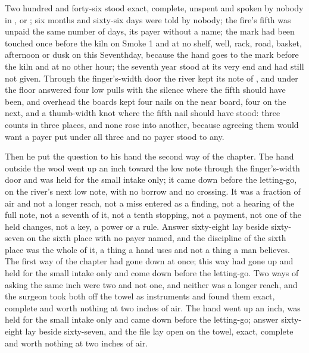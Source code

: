 Two hundred and forty-six stood exact, complete, unspent and spoken by nobody in ,  or ; six months and sixty-six days were told by nobody; the fire's fifth was unpaid the same number of days, its payer without a name; the mark had been touched once before the kiln on Smoke 1 and at no shelf, well, rack, road, basket, afternoon or dusk on this Seventhday, because the hand goes to the mark before the kiln and at no other hour; the seventh year stood at its very end and had still not given. Through the finger's-width door the river kept its note of , and under the floor  answered four low pulls with the silence where the fifth should have been, and overhead the boards kept four nails on the near board, four on the next, and a thumb-width knot where the fifth nail should have stood: three counts in three places, and none rose into another, because agreeing them would want a payer put under all three and no payer stood to any.

Then he put the question to his hand the second way of the chapter. The hand outside the wool went up an inch toward the low note through the finger's-width door and was held for the small intake only; it came down before the letting-go, on the river's next low note, with no borrow and no crossing. It was a fraction of air and not a longer reach, not a miss entered as a finding, not a hearing of the full note, not a seventh of it, not a tenth stopping, not a payment, not one of the held changes, not a key, a power or a rule. Answer sixty-eight lay beside sixty-seven on the sixth place with no payer named, and the discipline of the sixth place was the whole of it, a thing a hand uses and not a thing a man believes. The first way of the chapter had gone down at once; this way had gone up and held for the small intake only and come down before the letting-go. Two ways of asking the same inch were two and not one, and neither was a longer reach, and the surgeon took both off the towel as instruments and found them exact, complete and worth nothing at two inches of air. The hand went up an inch, was held for the small intake only and came down before the letting-go; answer sixty-eight lay beside sixty-seven, and the file lay open on the towel, exact, complete and worth nothing at two inches of air.
